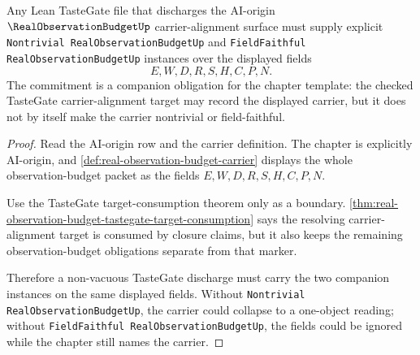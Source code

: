 \begin{theorem}
\label{thm:real-observation-budget-field-faithful-commitment}
Any Lean TasteGate file that discharges the AI-origin $\RealObservationBudgetUp$ carrier-alignment surface must supply explicit \texttt{Nontrivial RealObservationBudgetUp} and \texttt{FieldFaithful RealObservationBudgetUp} instances over the displayed fields
$$
E,W,D,R,S,H,C,P,N.
$$
The commitment is a companion obligation for the chapter template: the checked TasteGate carrier-alignment target may record the displayed carrier, but it does not by itself make the carrier nontrivial or field-faithful.
\end{theorem}
\begin{proof}
Read the AI-origin row and the carrier definition. The chapter is explicitly AI-origin, and \autoref{def:real-observation-budget-carrier} displays the whole observation-budget packet as the fields $E,W,D,R,S,H,C,P,N$.

Use the TasteGate target-consumption theorem only as a boundary. \autoref{thm:real-observation-budget-tastegate-target-consumption} says the resolving carrier-alignment target is consumed by closure claims, but it also keeps the remaining observation-budget obligations separate from that marker.

Therefore a non-vacuous TasteGate discharge must carry the two companion instances on the same displayed fields. Without \texttt{Nontrivial RealObservationBudgetUp}, the carrier could collapse to a one-object reading; without \texttt{FieldFaithful RealObservationBudgetUp}, the fields could be ignored while the chapter still names the carrier.
\end{proof}

